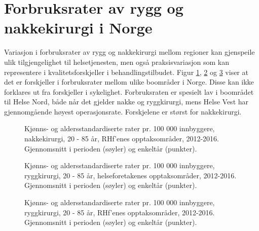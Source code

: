 
% 





\section{Forbruksrater av rygg og nakkekirurgi i Norge}
Variasjon i forbruksrater av rygg og nakkekirurgi mellom regioner kan 
gjenspeile ulik tilgjengelighet til helsetjenesten, men også praksisvariasjon som kan
representere i kvalitetsforskjeller i behandlingstilbudet. Figur \ref{fig:AA_Nakkekirurgi_BoRHF1}, \ref{fig:AA_Ryggkirurgi_BoHF1} og \ref{fig:AA_Ryggkirurgi_BoRHF1} viser at det
er forskjeller i forbruksrater mellom ulike boområder i Norge. Disse kan ikke
forklares ut fra forskjeller i sykelighet. Forbruksraten er spesielt lav i boområdet til
Helse Nord, både når det gjelder nakke og ryggkirurgi, mens Helse Vest har gjennomgående høyest operasjonsrate. Forskjelene er størst for nakkekirurgi.

\begin{figure}[ht]
\caption{Kjønns- og aldersstandardiserte rater pr. 100 000 innbyggere, nakkekirurgi, 20 - 85 år, RHf’enes opptaksområder, 2012-2016. Gjennomsnitt i perioden (søyler) og enkeltår (punkter).}
\label{fig:AA_Nakkekirurgi_BoRHF1}
\end{figure}

\begin{figure}[ht]
\caption{Kjønns- og aldersstandardiserte rater pr. 100 000 innbyggere, ryggkirurgi, 20 - 85 år, helseforetakenes opptaksområder, 2012-2016. Gjennomsnitt i perioden (søyler) og enkeltår (punkter).}
\label{fig:AA_Ryggkirurgi_BoHF1}
\end{figure}

\begin{figure}[ht]
\caption{Kjønns- og aldersstandardiserte rater pr. 100 000 innbyggere, ryggkirurgi, 20 - 85 år, RHf’enes opptaksområder, 2012-2016. Gjennomsnitt i perioden (søyler) og enkeltår (punkter).}
\label{fig:AA_Ryggkirurgi_BoRHF1}
\end{figure}

